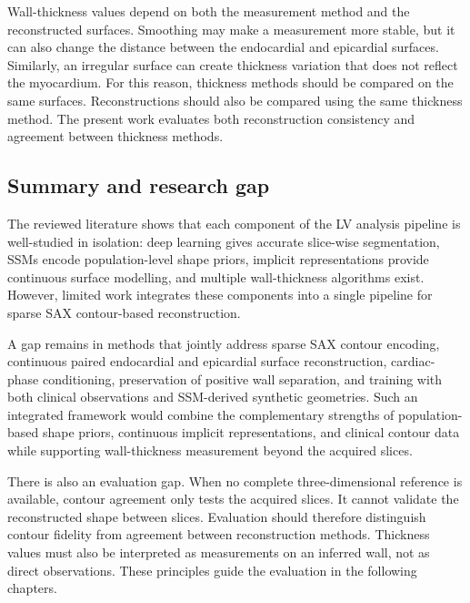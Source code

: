 Wall-thickness values depend on both the measurement method and the reconstructed
surfaces. Smoothing may make a measurement more stable, but it can also change
the distance between the endocardial and epicardial surfaces. Similarly, an
irregular surface can create thickness variation that does not reflect the
myocardium. For this reason, thickness methods should be compared on the same
surfaces. Reconstructions should also be compared using the same thickness
method. The present work evaluates both reconstruction consistency and agreement
between thickness methods.

\subsection{Summary and research gap}
\label{subsec:research-gap}

\noindent
The reviewed literature shows that each component of the LV analysis pipeline is
well-studied in isolation: deep learning gives accurate slice-wise segmentation,
SSMs encode population-level shape priors, implicit representations provide
continuous surface modelling, and multiple wall-thickness algorithms exist.
However, limited work integrates these components into a single pipeline for
sparse SAX contour-based reconstruction.

A gap remains in methods that jointly address sparse SAX contour encoding,
continuous paired endocardial and epicardial surface reconstruction, cardiac-phase
conditioning, preservation of positive wall separation, and training with both
clinical observations and SSM-derived synthetic geometries. Such an integrated
framework would combine the complementary strengths of population-based shape
priors, continuous implicit representations, and clinical contour data while
supporting wall-thickness measurement beyond the acquired slices.

There is also an evaluation gap. When no complete three-dimensional reference is
available, contour agreement only tests the acquired slices. It cannot validate
the reconstructed shape between slices. Evaluation should therefore distinguish
contour fidelity from agreement between reconstruction methods. Thickness values
must also be interpreted as measurements on an inferred wall, not as direct
observations. These principles guide the evaluation in the following chapters.
